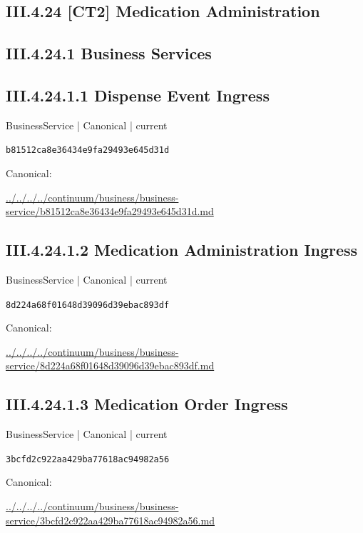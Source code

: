 \documentclass[10pt,a4paper]{article}
\begin{document}
\subsection*{III.4.24 [CT2] Medication Administration}
\subsection*{III.4.24.1 Business Services}
\subsection*{III.4.24.1.1 Dispense Event Ingress}
{\small BusinessService | Canonical | current}\par
\texttt{b81512ca8e36434e9fa29493e645d31d}\par
Canonical: \par
{\footnotesize\url{../../../../continuum/business/business-service/b81512ca8e36434e9fa29493e645d31d.md}}\par
\subsection*{III.4.24.1.2 Medication Administration Ingress}
{\small BusinessService | Canonical | current}\par
\texttt{8d224a68f01648d39096d39ebac893df}\par
Canonical: \par
{\footnotesize\url{../../../../continuum/business/business-service/8d224a68f01648d39096d39ebac893df.md}}\par
\subsection*{III.4.24.1.3 Medication Order Ingress}
{\small BusinessService | Canonical | current}\par
\texttt{3bcfd2c922aa429ba77618ac94982a56}\par
Canonical: \par
{\footnotesize\url{../../../../continuum/business/business-service/3bcfd2c922aa429ba77618ac94982a56.md}}\par
\end{document}
